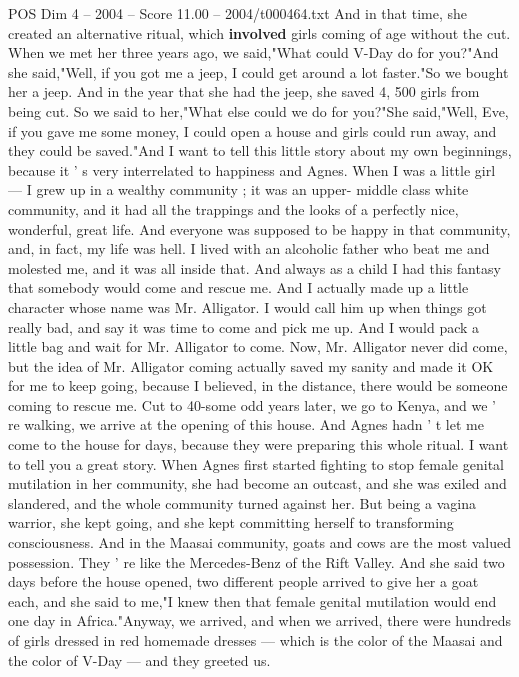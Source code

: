 \begin{textsample}{POS Dim 4 – 2004 – Score 11.00 – 2004/t000464.txt}
And in that time, she created an alternative ritual, which \textbf{involved} girls coming of age without the cut.
When we met her three years ago, we said,"What could V-Day do for you?"And she said,"Well, if you got me a jeep, I could get around a lot faster."So we bought her a jeep.
And in the year that she had the jeep, she saved 4, 500 girls from being cut.
So we said to her,"What else could we do for you?"She said,"Well, Eve, if you gave me some money, I could open a house and girls could run away, and they could be saved."And I want to tell this little story about my own beginnings, because it ' s very interrelated to happiness and Agnes.
When I was a little girl — I grew up in a wealthy community ; it was an upper- middle class white community, and it had all the trappings and the looks of a perfectly nice, wonderful, great life.
And everyone was supposed to be happy in that community, and, in fact, my life was hell.
I lived with an alcoholic father who beat me and molested me, and it was all inside that.
And always as a child I had this fantasy that somebody would come and rescue me.
And I actually made up a little character whose name was Mr.
Alligator.
I would call him up when things got really bad, and say it was time to come and pick me up.
And I would pack a little bag and wait for Mr.
Alligator to come.
Now, Mr.
Alligator never did come, but the idea of Mr.
Alligator coming actually saved my sanity and made it OK for me to keep going, because I believed, in the distance, there would be someone coming to rescue me.
Cut to 40-some odd years later, we go to Kenya, and we ' re walking, we arrive at the opening of this house.
And Agnes hadn ' t let me come to the house for days, because they were preparing this whole ritual.
I want to tell you a great story.
When Agnes first started fighting to stop female genital mutilation in her community, she had become an outcast, and she was exiled and slandered, and the whole community turned against her.
But being a vagina warrior, she kept going, and she kept committing herself to transforming consciousness.
And in the Maasai community, goats and cows are the most valued possession.
They ' re like the Mercedes-Benz of the Rift Valley.
And she said two days before the house opened, two different people arrived to give her a goat each, and she said to me,"I knew then that female genital mutilation would end one day in Africa."Anyway, we arrived, and when we arrived, there were hundreds of girls dressed in red homemade dresses — which is the color of the Maasai and the color of V-Day — and they greeted us.

\end{textsample}
